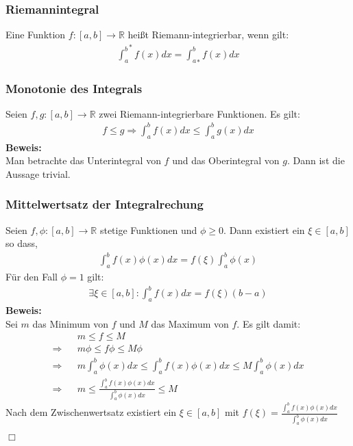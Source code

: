 \documentclass[a4paper]{article}
\begin{document}
\subsubsection{Riemannintegral}
Eine Funktion $f: [a,b] \rightarrow \mathbb{R}$ heißt Riemann-integrierbar, wenn gilt: 
\begin{align*}
{\int_a^b}^* f(x)dx  = {\int_a^b}_* f(x)dx 
\end{align*}
\subsubsection{Monotonie des Integrals}
Seien $f,g: [a,b] \rightarrow \mathbb{R}$ zwei Riemann-integrierbare Funktionen. Es gilt:
\begin{align*}
f \leq g \Rightarrow \int_a^b f(x) dx \leq \int_a^b g(x) dx 
\end{align*}
\textbf{Beweis:} \\
Man betrachte das Unterintegral von $f$ und das Oberintegral von $g$. Dann ist die Aussage trivial. 
\subsubsection{Mittelwertsatz der Integralrechung}
Seien $f,\phi: [a,b] \rightarrow \mathbb{R}$ stetige Funktionen und $\phi \geq 0$. Dann existiert ein $\xi \in [a,b]$ so dass, 
\begin{align*}
\int_a^b f(x) \phi (x) dx = f(\xi) \int_a^b \phi (x)
\end{align*}
Für den Fall $\phi = 1$ gilt:
\begin{align*}
\exists \xi \in [a,b]: \int_a^b f(x) dx = f(\xi)(b-a)
\end{align*}
\textbf{Beweis:}\\
Sei $m$ das Minimum von $f$ und $M$ das Maximum von $f$. Es gilt damit:
\begin{align*}
&& m \leq f \leq M \\
\Rightarrow && m\phi \leq f\phi \leq M\phi \\
\Rightarrow && m \int_a^b \phi (x) dx \leq \int_a^b f(x) \phi (x) dx \leq M \int_a^b \phi (x) dx \\
\Rightarrow && m \leq \frac{\int_a^b f(x) \phi (x) dx}{\int_a^b \phi (x) dx} \leq M
\end{align*}
Nach dem Zwischenwertsatz existiert ein $\xi \in [a,b]$ mit $f(\xi)=\frac{\int_a^b f(x) \phi (x) dx}{\int_a^b \phi (x) dx}$
\begin{flushright}
$\Box$
\end{flushright}
\end{document}
